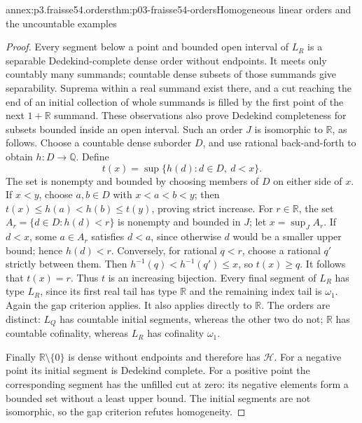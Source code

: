 \begin{annexitem}{annex:p3.fraisse54.orders}{thm:p03-fraisse54-orders}{Homogeneous linear orders and the uncountable examples}
\begin{proof}
Every segment below a point and bounded open interval of \(L_R\) is a
separable Dedekind-complete dense order without endpoints. It meets only
countably many summands; countable dense subsets of those summands give
separability. Suprema within a real summand exist there, and a cut reaching
the end of an initial collection of whole summands is filled by the first
point of the next \(1+\mathbb R\) summand. These observations also prove
Dedekind completeness for subsets bounded inside an open interval.
Such an order \(J\) is isomorphic to \(\mathbb R\), as follows. Choose a
countable dense suborder \(D\), and use rational back-and-forth to obtain
\(h:D\to\mathbb Q\). Define
\[
 t(x)=\sup\{h(d):d\in D,\ d<x\}.
\]
The set is nonempty and bounded by choosing members of \(D\) on either
side of \(x\). If \(x<y\), choose \(a,b\in D\) with
\(x<a<b<y\); then \(t(x)\leq h(a)<h(b)\leq t(y)\), proving strict
increase. For \(r\in\mathbb R\), the set
\(A_r=\{d\in D:h(d)<r\}\) is nonempty and bounded in \(J\); let
\(x=\sup_JA_r\). If \(d<x\), some \(a\in A_r\) satisfies \(d<a\),
since otherwise \(d\) would be a smaller upper bound; hence \(h(d)<r\).
Conversely, for rational \(q<r\), choose a rational \(q'\) strictly
between them. Then \(h^{-1}(q)<h^{-1}(q')\leq x\), so \(t(x)\geq q\).
It follows that \(t(x)=r\). Thus \(t\) is an increasing bijection.
Every final segment of \(L_R\) has type \(L_R\), since its first real
tail has type \(\mathbb R\) and the remaining index tail is
\(\omega_1\). Again the gap criterion applies. It also applies directly
to \(\mathbb R\). The orders are distinct: \(L_Q\) has countable
initial segments, whereas the other two do not; \(\mathbb R\) has
countable cofinality, whereas \(L_R\) has cofinality \(\omega_1\).

Finally \(\mathbb R\setminus\{0\}\) is dense without endpoints and
therefore has \(\mathcal H\). For a negative point its initial segment
is Dedekind complete. For a positive point the corresponding segment has
the unfilled cut at zero: its negative elements form a bounded set without
a least upper bound. The initial segments are not isomorphic, so the gap
criterion refutes homogeneity.
\end{proof}
\end{annexitem}

